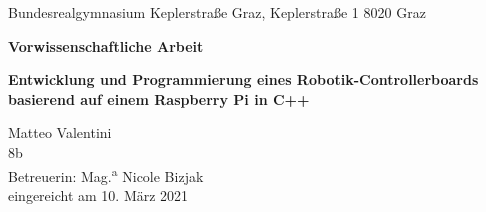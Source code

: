 \documentclass[12pt]{article}
\begin{document}
\fontsize{12pt}{18pt}\selectfont
\thispagestyle{empty}
\begin{center}
\fontsize{20pt}{10pt}\selectfont
Bundesrealgymnasium Keplerstraße Graz, Keplerstraße 1 8020 Graz
\end{center}
\vspace{20mm}
\begin{center}
\fontsize{26pt}{10pt}\selectfont
\textbf{Vorwissenschaftliche Arbeit}
\end{center}
\vspace{20mm}
\begin{center}
\fontsize{28pt}{28pt}\selectfont
\textbf{Entwicklung und Programmierung eines Robotik-Controllerboards basierend auf einem Raspberry Pi in C++}
\end{center}
\vspace{20mm}
\begin{center}
\fontsize{20pt}{32pt}\selectfont
Matteo Valentini\\
8b\\
Betreuerin: Mag.\textsuperscript{a} Nicole Bizjak\\
eingereicht am 10. März 2021
\end{center}
\end{document}
